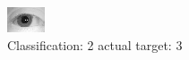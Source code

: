 \begin{figure}[h!]
\begin{center}
\includegraphics[width=0.60\columnwidth]{figures/ID1204_class_2_target_3.png}
\end{center}
\caption{ Classification: 2 actual target: 3}
\label{fig:ID1204_class_2_target_3}
\end{figure}
